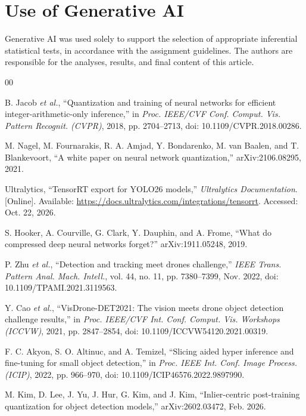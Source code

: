 \documentclass[conference]{IEEEtran}
\begin{document}
\section*{Use of Generative AI}
Generative AI was used solely to support the selection of appropriate inferential statistical tests, in accordance with the assignment guidelines. The authors are responsible for the analyses, results, and final content of this article.

\begin{thebibliography}{00}

B. Jacob \textit{et al.}, ``Quantization and training of neural networks for efficient
integer-arithmetic-only inference,'' in \textit{Proc. IEEE/CVF Conf. Comput. Vis. Pattern
Recognit. (CVPR)}, 2018, pp. 2704--2713, doi: 10.1109/CVPR.2018.00286.

M. Nagel, M. Fournarakis, R. A. Amjad, Y. Bondarenko, M. van Baalen, and T. Blankevoort,
``A white paper on neural network quantization,'' arXiv:2106.08295, 2021.

Ultralytics, ``TensorRT export for YOLO26 models,'' \textit{Ultralytics Documentation}. [Online].
Available: \url{https://docs.ultralytics.com/integrations/tensorrt}. Accessed: Oct. 22, 2026.

S. Hooker, A. Courville, G. Clark, Y. Dauphin, and A. Frome, ``What do compressed deep neural
networks forget?'' arXiv:1911.05248, 2019.

P. Zhu \textit{et al.}, ``Detection and tracking meet drones challenge,'' \textit{IEEE Trans.
Pattern Anal. Mach. Intell.}, vol. 44, no. 11, pp. 7380--7399, Nov. 2022,
doi: 10.1109/TPAMI.2021.3119563.

Y. Cao \textit{et al.}, ``VisDrone-DET2021: The vision meets drone object detection challenge
results,'' in \textit{Proc. IEEE/CVF Int. Conf. Comput. Vis. Workshops (ICCVW)}, 2021,
pp. 2847--2854, doi: 10.1109/ICCVW54120.2021.00319.

F. C. Akyon, S. O. Altinuc, and A. Temizel, ``Slicing aided hyper inference and fine-tuning for
small object detection,'' in \textit{Proc. IEEE Int. Conf. Image Process. (ICIP)}, 2022,
pp. 966--970, doi: 10.1109/ICIP46576.2022.9897990.

M. Kim, D. Lee, J. Yu, J. Hur, G. Kim, and J. Kim, ``Inlier-centric post-training quantization
for object detection models,'' arXiv:2602.03472, Feb. 2026.


\end{thebibliography}
\end{document}
